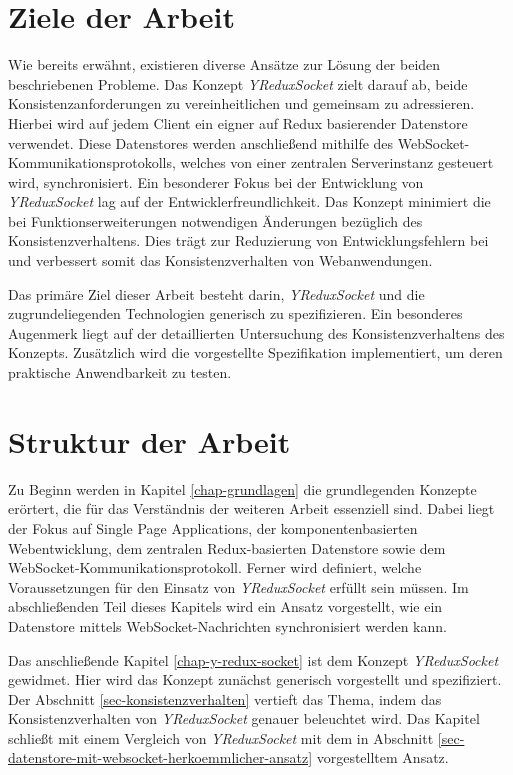 \documentclass[12pt]{book}          %
\begin{document}
\section{Ziele der Arbeit}
\label{sec-ziele-der-arbeit}

Wie bereits erwähnt, existieren diverse Ansätze zur Lösung der beiden beschriebenen Probleme. Das Konzept \textit{YReduxSocket} zielt darauf ab, beide Konsistenzanforderungen zu vereinheitlichen und gemeinsam zu adressieren. Hierbei wird auf jedem Client ein eigner auf Redux basierender Datenstore verwendet. Diese Datenstores werden anschließend mithilfe des WebSocket-Kommunikationsprotokolls, welches von einer zentralen Serverinstanz gesteuert wird, synchronisiert. Ein besonderer Fokus bei der Entwicklung von \textit{YReduxSocket} lag auf der Entwicklerfreundlichkeit. Das Konzept minimiert die bei Funktionserweiterungen notwendigen Änderungen bezüglich des Konsistenzverhaltens. Dies trägt zur Reduzierung von Entwicklungsfehlern bei und verbessert somit das Konsistenzverhalten von Webanwendungen.

Das primäre Ziel dieser Arbeit besteht darin, \textit{YReduxSocket} und die zugrundeliegenden Technologien generisch zu spezifizieren. Ein besonderes Augenmerk liegt auf der detaillierten Untersuchung des Konsistenzverhaltens des Konzepts. Zusätzlich wird die vorgestellte Spezifikation implementiert, um deren praktische Anwendbarkeit zu testen. \\

\section{Struktur der Arbeit}
\label{sec-struktur-der-arbeit}

Zu Beginn werden in Kapitel \ref{chap-grundlagen} die grundlegenden Konzepte erörtert, die für das Verständnis der weiteren Arbeit essenziell sind. Dabei liegt der Fokus auf Single Page Applications, der komponentenbasierten Webentwicklung, dem zentralen Redux-basierten Datenstore sowie dem WebSocket-Kommunikationsprotokoll. Ferner wird definiert, welche Voraussetzungen für den Einsatz von \textit{YReduxSocket} erfüllt sein müssen. Im abschließenden Teil dieses Kapitels wird ein Ansatz vorgestellt, wie ein Datenstore mittels WebSocket-Nachrichten synchronisiert werden kann.

Das anschließende Kapitel \ref{chap-y-redux-socket} ist dem Konzept \textit{YReduxSocket} gewidmet. Hier wird das Konzept zunächst generisch vorgestellt und spezifiziert. Der Abschnitt \ref{sec-konsistenzverhalten} vertieft das Thema, indem das Konsistenzverhalten von \textit{YReduxSocket} genauer beleuchtet wird. Das Kapitel schließt mit einem Vergleich von \textit{YReduxSocket} mit dem in Abschnitt \ref{sec-datenstore-mit-websocket-herkoemmlicher-ansatz} vorgestelltem Ansatz.
\end{document}
